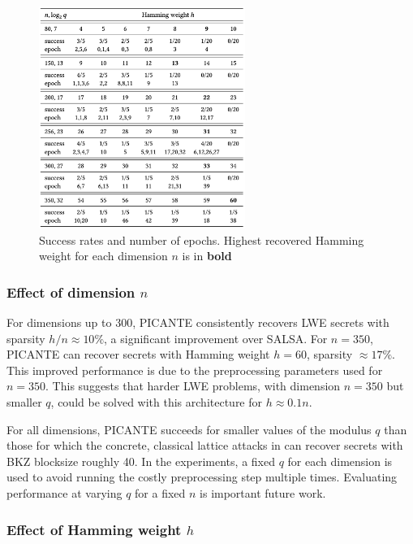 \documentclass{article}
\begin{document}
\begin{figure}[h]
    \centering
    \includegraphics[width=0.6\textwidth]{Materials/Picante_performance.png}
    \caption{Success rates and number of epochs. Highest recovered Hamming weight for each dimension \( n \) is in \textbf{bold}}
    \label{fig:picante_performance}
\end{figure}

\subsubsection{Effect of dimension \( n \)}

For dimensions up to 300, PICANTE consistently recovers LWE secrets with sparsity \( h/n \approx 10\% \), a significant improvement over SALSA. For \( n = 350 \), PICANTE can recover secrets with Hamming weight \( h = 60 \), sparsity \( \approx 17\% \). This improved performance is due to the preprocessing parameters used for \( n = 350 \). This suggests that harder LWE problems, with dimension \( n = 350 \) but smaller \( q \), could be solved with this architecture for \( h \approx 0.1n \).

For all dimensions, PICANTE succeeds for smaller values of the modulus \( q \) than those for which the concrete, classical lattice attacks in \cite{12} can recover secrets with BKZ blocksize roughly 40. In the experiments, a fixed \( q \) for each dimension is used to avoid running the costly preprocessing step multiple times. Evaluating performance at varying \( q \) for a fixed \( n \) is important future work.

\subsubsection{Effect of Hamming weight \( h \)}
\end{document}
